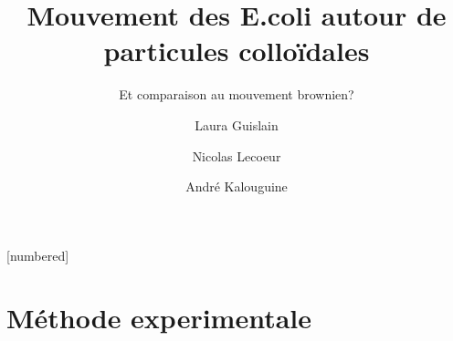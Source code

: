 \documentclass[11pt]{beamer}
\begin{document}
	\author{Laura Guislain \and Nicolas Lecoeur \and André Kalouguine}
	\title{Mouvement des E.coli autour de particules colloïdales}
	\subtitle{Et comparaison au mouvement brownien?}
	\subject{Characterization du mouvement bactérien et comparaison au mouvement brownien.}
	[numbered]
\begin{frame}[plain]
	\maketitle
\end{frame}
\addtocounter{framenumber}{-1}


\section{Méthode experimentale}
\end{document}
